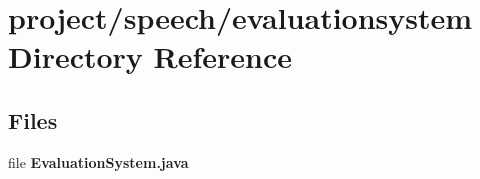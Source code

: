 \section{project/speech/evaluationsystem Directory Reference}
\label{dir_20148f4887fc342b024796374ade48f3}
\subsection*{Files}
\begin{DoxyCompactItemize}
\item 
file {\bf Evaluation\+System.\+java}
\end{DoxyCompactItemize}
